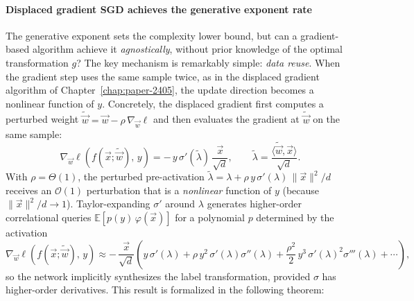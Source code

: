 \paragraph{Displaced gradient SGD achieves the generative exponent rate}
The generative exponent sets the complexity lower bound, but can a gradient-based algorithm achieve it \emph{agnostically}, without prior knowledge of the optimal transformation \(g\)? The key mechanism is remarkably simple: \emph{data reuse}. When the gradient step uses the same sample twice, as in the displaced gradient algorithm of Chapter~\ref{chap:paper-2405}, the update direction becomes a nonlinear function of \(y\). Concretely, the displaced gradient first computes a perturbed weight \(\tilde{\vec{w}} = \vec{w} - \rho\,\nabla_{\vec{w}}\ell\) and then evaluates the gradient at \(\tilde{\vec{w}}\) on the same sample: 
\[
    \nabla_{\vec{w}}\ell\!\left(f(\vec{x};\tilde{\vec{w}}),\,y\right) = -\,y\,\sigma'(\tilde{\lambda})\,\frac{\vec{x}}{\sqrt{d}}, \qquad \tilde{\lambda} = \frac{\langle\tilde{\vec{w}},\vec{x}\rangle}{\sqrt{d}}.
\]
With \(\rho = \Theta(1)\), the perturbed pre-activation \(\tilde{\lambda} = \lambda + \rho\,y\,\sigma'(\lambda)\,\|\vec{x}\|^2/d\) receives an \(\mathcal{O}(1)\) perturbation that is a \emph{nonlinear} function of \(y\) (because \(\|\vec{x}\|^2/d \to 1\)). Taylor-expanding \(\sigma'\) around \(\lambda\) generates higher-order correlational queries \(\mathbb{E}[p(y)\,\varphi(\vec{x})]\) for a polynomial \(p\) determined by the activation
\[
    \nabla_{\vec{w}}\ell\!\left(f(\vec{x};\tilde{\vec{w}}),\,y\right) \approx -\,\frac{\vec{x}}{\sqrt{d}} \left(y\,\sigma'(\lambda) + \rho\,y^2\,\sigma'(\lambda)\sigma''(\lambda) + \frac{\rho^2}{2}\,y^3\,\sigma'(\lambda)^2\sigma'''(\lambda) + \cdots \right),
\] so the network implicitly synthesizes the label transformation, provided \(\sigma\) has higher-order derivatives.
This result is formalized in the following theorem:
